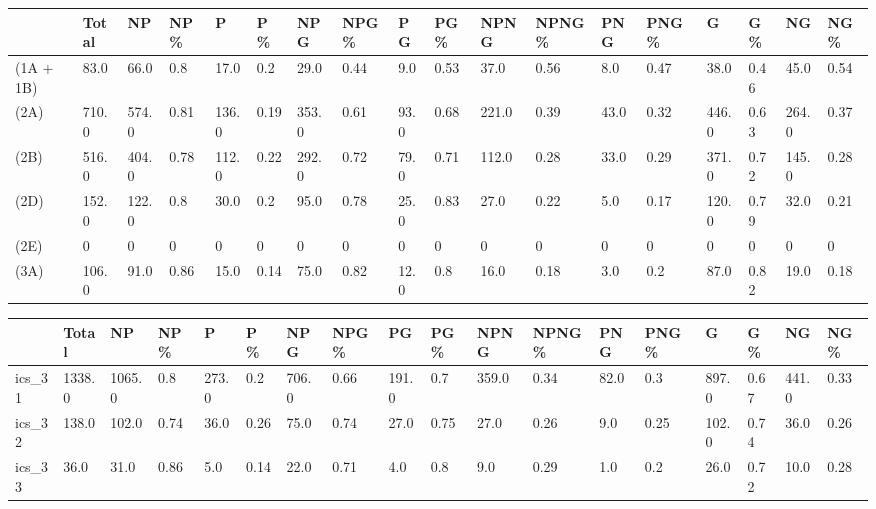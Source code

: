 \begin{table*}
\begin{tabular}{llllllllllllllllll}
\toprule
                                    &  Total &     NP &   NP\% &      P &   P \% &    NPG &  NPG\% &    PG &   PG\% &   NPNG & NPNG\% &   PNG & PNG \% &      G &    G\% &     NG &   NG\% \\
\midrule
           (1A + 1B) &   83.0 &   66.0 &   0.8 &   17.0 &   0.2 &   29.0 &  0.44 &   9.0 &  0.53 &   37.0 &  0.56 &   8.0 &  0.47 &   38.0 &  0.46 &   45.0 &  0.54 \\
                    (2A) &  710.0 &  574.0 &  0.81 &  136.0 &  0.19 &  353.0 &  0.61 &  93.0 &  0.68 &  221.0 &  0.39 &  43.0 &  0.32 &  446.0 &  0.63 &  264.0 &  0.37 \\
                   (2B) &  516.0 &  404.0 &  0.78 &  112.0 &  0.22 &  292.0 &  0.72 &  79.0 &  0.71 &  112.0 &  0.28 &  33.0 &  0.29 &  371.0 &  0.72 &  145.0 &  0.28 \\
      (2D) &  152.0 &  122.0 &   0.8 &   30.0 &   0.2 &   95.0 &  0.78 &  25.0 &  0.83 &   27.0 &  0.22 &   5.0 &  0.17 &  120.0 &  0.79 &   32.0 &  0.21 \\
     (2E) &      0 &      0 &     0 &      0 &     0 &      0 &     0 &     0 &     0 &      0 &     0 &     0 &     0 &      0 &     0 &      0 &     0 \\
(3A) &  106.0 &   91.0 &  0.86 &   15.0 &  0.14 &   75.0 &  0.82 &  12.0 &   0.8 &   16.0 &  0.18 &   3.0 &   0.2 &   87.0 &  0.82 &   19.0 &  0.18 \\
\bottomrule
\end{tabular}
\end{table*}


\begin{table*}
\begin{tabular}{llllllllllllllllll}
\toprule
       &   Total &      NP &   NP\% &      P &   P \% &    NPG &  NPG\% &     PG &   PG\% &   NPNG & NPNG\% &   PNG & PNG \% &      G &    G\% &     NG &   NG\% \\
\midrule
ics\_31 &  1338.0 &  1065.0 &   0.8 &  273.0 &   0.2 &  706.0 &  0.66 &  191.0 &   0.7 &  359.0 &  0.34 &  82.0 &   0.3 &  897.0 &  0.67 &  441.0 &  0.33 \\
ics\_32 &   138.0 &   102.0 &  0.74 &   36.0 &  0.26 &   75.0 &  0.74 &   27.0 &  0.75 &   27.0 &  0.26 &   9.0 &  0.25 &  102.0 &  0.74 &   36.0 &  0.26 \\
ics\_33 &    36.0 &    31.0 &  0.86 &    5.0 &  0.14 &   22.0 &  0.71 &    4.0 &   0.8 &    9.0 &  0.29 &   1.0 &   0.2 &   26.0 &  0.72 &   10.0 &  0.28 \\
\bottomrule
\end{tabular}
\end{table*}